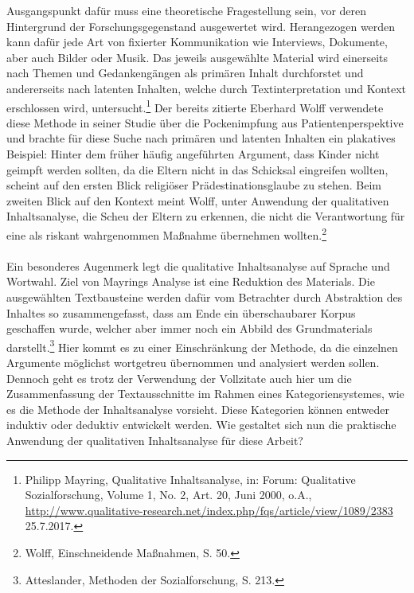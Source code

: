 \documentclass[
    a4paper,
    12pt,
    hyphens,
    chapterprefix=true,
    headheight=33pt,
    footheight=29pt,
    headings=optiontohead, %
]{scrartcl}
\begin{document}
Ausgangspunkt dafür muss eine theoretische Fragestellung sein, vor deren Hintergrund der Forschungsgegenstand ausgewertet wird. Herangezogen werden kann dafür jede Art von fixierter Kommunikation wie Interviews, Dokumente, aber auch Bilder oder Musik. Das jeweils ausgewählte Material wird einerseits nach Themen und Gedankengängen als primären Inhalt durchforstet und andererseits nach latenten Inhalten, welche durch Textinterpretation und Kontext erschlossen wird, untersucht.\footnote{Philipp Mayring, Qualitative Inhaltsanalyse, in: Forum: Qualitative Sozialforschung, Volume 1, No. 2, Art. 20, Juni 2000, o.A., \url{http://www.qualitative-research.net/index.php/fqs/article/view/1089/2383} 25.7.2017.} Der bereits zitierte Eberhard Wolff verwendete diese Methode in seiner Studie über die Pockenimpfung aus Patientenperspektive und brachte für diese Suche nach primären und latenten Inhalten ein plakatives Beispiel: Hinter dem früher häufig angeführten Argument, dass Kinder nicht geimpft werden sollten, da die Eltern nicht in das Schicksal eingreifen wollten, scheint auf den ersten Blick religiöser Prädestinationsglaube zu stehen. Beim zweiten Blick auf den Kontext meint Wolff, unter Anwendung der qualitativen Inhaltsanalyse, die Scheu der Eltern zu erkennen, die nicht die Verantwortung für eine als riskant wahrgenommen Maßnahme übernehmen wollten.\footnote{Wolff, Einschneidende Maßnahmen, S. 50.}\\
\\
Ein besonderes Augenmerk legt die qualitative Inhaltsanalyse auf Sprache und Wortwahl. Ziel von Mayrings Analyse ist eine Reduktion des Materials. Die ausgewählten Textbausteine werden dafür vom Betrachter durch Abstraktion des Inhaltes so zusammengefasst, dass am Ende ein überschaubarer Korpus geschaffen wurde, welcher aber immer noch ein Abbild des Grundmaterials darstellt.\footnote{Atteslander, Methoden der Sozialforschung, S. 213.} Hier kommt es zu einer Einschränkung der Methode, da die einzelnen Argumente möglichst wortgetreu übernommen und analysiert werden sollen. Dennoch geht es trotz der Verwendung der Vollzitate auch hier um die Zusammenfassung der Textausschnitte im Rahmen eines Kategoriensystemes, wie es die Methode der Inhaltsanalyse vorsieht. Diese Kategorien können entweder induktiv oder deduktiv entwickelt werden. Wie gestaltet sich nun die praktische Anwendung der qualitativen Inhaltsanalyse für diese Arbeit?
\end{document}
